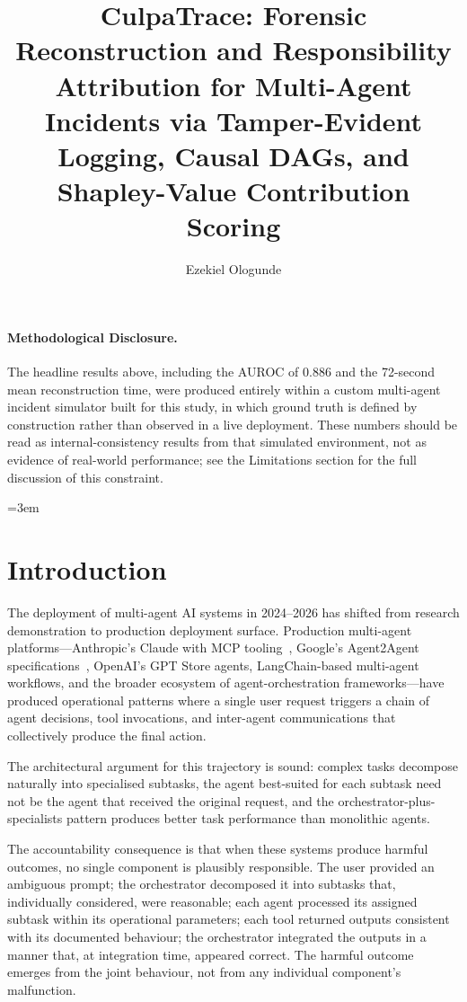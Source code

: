 \documentclass[sigconf,nonacm]{acmart}
\title{CulpaTrace: Forensic Reconstruction and Responsibility Attribution for Multi-Agent Incidents via Tamper-Evident Logging, Causal DAGs, and Shapley-Value Contribution Scoring}
\author{Ezekiel Ologunde}
\affiliation{%
  \institution{Independent Researcher}
  \city{Boston}
  \state{MA}
  \country{USA}}
\begin{document}
\maketitle

\paragraph{Methodological Disclosure.} The headline results above, including the AUROC of 0.886 and the 72-second mean reconstruction time, were produced entirely within a custom multi-agent incident simulator built for this study, in which ground truth is defined by construction rather than observed in a live deployment. These numbers should be read as internal-consistency results from that simulated environment, not as evidence of real-world performance; see the Limitations section for the full discussion of this constraint.

\sloppy
{}
\emergencystretch=3em
\hfuzz=10pt

\section{Introduction}

The deployment of multi-agent AI systems in 2024--2026 has shifted
from research demonstration to production deployment surface.
Production multi-agent platforms---Anthropic's Claude with MCP
tooling~\cite{anthropic2024mcp}, Google's Agent2Agent
specifications~\cite{google2024a2a}, OpenAI's GPT Store agents,
LangChain-based multi-agent workflows, and the broader ecosystem
of agent-orchestration frameworks---have produced operational
patterns where a single user request triggers a chain of agent
decisions, tool invocations, and inter-agent communications that
collectively produce the final action.

The architectural argument for this trajectory is sound: complex
tasks decompose naturally into specialised subtasks, the agent
best-suited for each subtask need not be the agent that received
the original request, and the orchestrator-plus-specialists pattern
produces better task performance than monolithic agents.

The accountability consequence is that when these systems produce
harmful outcomes, no single component is plausibly responsible. The
user provided an ambiguous prompt; the orchestrator decomposed it
into subtasks that, individually considered, were reasonable; each
agent processed its assigned subtask within its operational
parameters; each tool returned outputs consistent with its
documented behaviour; the orchestrator integrated the outputs in a
manner that, at integration time, appeared correct. The harmful
outcome emerges from the joint behaviour, not from any individual
component's malfunction.
\end{document}
